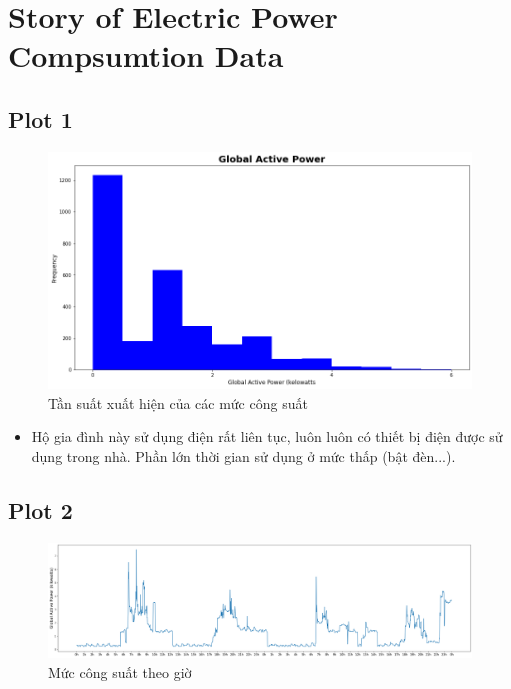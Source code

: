 \documentclass[a4paper, 12pt]{article}
\begin{document}
\clearpage
    
\section{Story of Electric Power Compsumtion Data}
    \subsection{Plot 1}
        \begin{figure}[H]
            \centering
            \includegraphics[scale=0.5]{img/GAP.png}
            \caption{Tần suất xuất hiện của các mức công suất}
        \end{figure}
        
        \begin{itemize}
            \item Hộ gia đình này sử dụng điện rất liên tục, luôn luôn có thiết bị điện được sử dụng trong nhà. Phần lớn thời gian sử dụng ở mức thấp (bật đèn...).
        \end{itemize}
        
    \subsection{Plot 2}
        \begin{figure}[H]
            \centering
            \includegraphics[scale=0.3]{img/GAP-hours.png}
            \caption{Mức công suất theo giờ}
        \end{figure}
        
\end{document}
